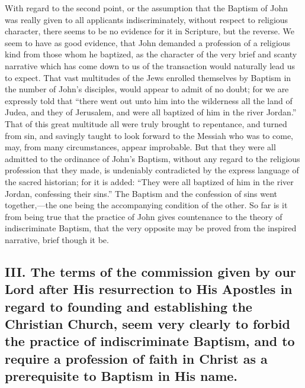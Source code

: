 \documentclass[]{book}
\begin{document}
With regard to the second point, or the assumption that the Baptism of John was really given to all applicants indiscriminately, without respect to religious character, there seems to be no evidence for it in Scripture, but the reverse. We seem to have as good evidence, that John demanded a profession of a religious kind from those whom he baptized, as the character of the very brief and scanty narrative which has come down to us of the transaction would naturally lead us to expect. That vast multitudes of the Jews enrolled themselves by Baptism in the number of John's disciples, would appear to admit of no doubt; for we are expressly told that ``there went out unto him into the wilderness all the land of Judea, and they of Jerusalem, and were all baptized of him in the river Jordan.'' That of this great multitude all were truly brought to repentance, and turned from sin, and savingly taught to look forward to the Messiah who was to come, may, from many circumstances, appear improbable. But that they were all admitted to the ordinance of John's Baptism, without any regard to the religious profession that they made, is undeniably contradicted by the express language of the sacred historian; for it is added: ``They were all baptized of him in the river Jordan, confessing their sins.'' The Baptism and the confession of sins went together,---the one being the accompanying condition of the other. So far is it from being true that the practice of John gives countenance to the theory of indiscriminate Baptism, that the very opposite may be proved from the inspired narrative, brief though it be.

\hypertarget{iii.-the-terms-of-the-commission-given-by-our-lord-after-his-resurrection-to-his-apostles-in-regard-to-founding-and-establishing-the-christian-church-seem-very-clearly-to-forbid-the-practice-of-indiscriminate-baptism-and-to-require-a-profession-of-faith-in-christ-as-a-prerequisite-to-baptism-in-his-name.}{%
\subsection{III. The terms of the commission given by our Lord after His resurrection to His Apostles in regard to founding and establishing the Christian Church, seem very clearly to forbid the practice of indiscriminate Baptism, and to require a profession of faith in Christ as a prerequisite to Baptism in His name.}\label{iii.-the-terms-of-the-commission-given-by-our-lord-after-his-resurrection-to-his-apostles-in-regard-to-founding-and-establishing-the-christian-church-seem-very-clearly-to-forbid-the-practice-of-indiscriminate-baptism-and-to-require-a-profession-of-faith-in-christ-as-a-prerequisite-to-baptism-in-his-name.}}
\end{document}
